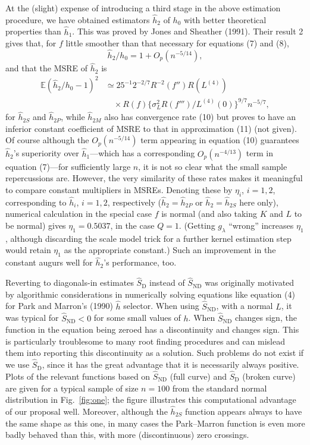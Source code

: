 \documentclass[11pt]{article}
\newcommand{\SND}{\widehat S_{\mathrm{ND}}}
\newcommand{\SD}{\widehat S_{\mathrm{D}}}
\begin{document}
At the (slight) expense of introducing a third stage in the above estimation procedure, we have obtained estimators $\widehat h_2$ of $h_0$ with better theoretical properties than $\widehat h_1$. This was proved by Jones and Sheather (1991). Their result 2 gives that, for $f$ little smoother than that necessary for equations (7) and (8),
\begin{equation}
\widehat h_2/h_0=1+O_p(n^{-5/14}),
\tag{10}
\end{equation}
and that the MSRE of $\widehat h_2$ is
\begin{equation}
\begin{split}
\mathbb E(\widehat h_2/h_0-1)^2
&\simeq25^{-1}2^{-2/7}R^{-2}(f'')R(L^{(4)})\\
&\quad\times R(f)\{\sigma_L^2R(f''')/L^{(4)}(0)\}^{9/7}n^{-5/7},
\end{split}
\tag{11}
\end{equation}
for $\widehat h_{2S}$ and $\widehat h_{2P}$, while $\widehat h_{2M}$ also has convergence rate (10) but proves to have an inferior constant coefficient of MSRE to that in approximation (11) (not given). Of course although the $O_p(n^{-5/14})$ term appearing in equation (10) guarantees $\widehat h_2$'s superiority over $\widehat h_1$---which has a corresponding $O_p(n^{-4/13})$ term in equation (7)---for sufficiently large $n$, it is not so clear what the small sample repercussions are. However, the very similarity of these rates makes it meaningful to compare constant multipliers in MSREs. Denoting these by $\eta_i$, $i=1,2$, corresponding to $\widehat h_i$, $i=1,2$, respectively ($\widehat h_2=\widehat h_{2P}$ or $\widehat h_2=\widehat h_{2S}$ here only), numerical calculation in the special case $f$ is normal (and also taking $K$ and $L$ to be normal) gives $\eta_1=0.5037$, in the case $Q=1$. (Getting $g_\lambda$ ``wrong'' increases $\eta_1$, although discarding the scale model trick for a further kernel estimation step would retain $\eta_1$ as the appropriate constant.) Such an improvement in the constant augurs well for $\widehat h_2$'s performance, too.

Reverting to diagonals-in estimates $\SD$ instead of $\SND$ was originally motivated by algorithmic considerations in numerically solving equations like equation (4) for Park and Marron's (1990) $\widehat h$ selector. When using $\SND$, with a normal $L$, it was typical for $\SND<0$ for some small values of $h$. When $\SND$ changes sign, the function in the equation being zeroed has a discontinuity and changes sign. This is particularly troublesome to many root finding procedures and can mislead them into reporting this discontinuity as a solution. Such problems do not exist if we use $\SD$, since it has the great advantage that it is necessarily always positive. Plots of the relevant functions based on $\SND$ (full curve) and $\SD$ (broken curve) are given for a typical sample of size $n=100$ from the standard normal distribution in Fig.~\ref{fig:one}; the figure illustrates this computational advantage of our proposal well. Moreover, although the $\widehat h_{2S}$ function appears always to have the same shape as this one, in many cases the Park--Marron function is even more badly behaved than this, with more (discontinuous) zero crossings.
\end{document}
